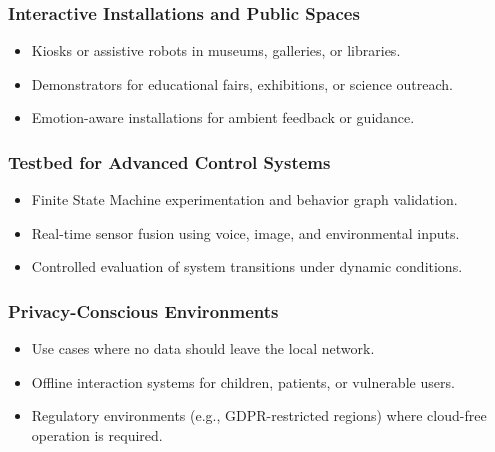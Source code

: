 \subsubsection*{Interactive Installations and Public Spaces}
\begin{itemize}
    \item Kiosks or assistive robots in museums, galleries, or libraries.
    \item Demonstrators for educational fairs, exhibitions, or science outreach.
    \item Emotion-aware installations for ambient feedback or guidance.
\end{itemize}

\subsubsection*{Testbed for Advanced Control Systems}
\begin{itemize}
    \item Finite State Machine experimentation and behavior graph validation.
    \item Real-time sensor fusion using voice, image, and environmental inputs.
    \item Controlled evaluation of system transitions under dynamic conditions.
\end{itemize}

\subsubsection*{Privacy-Conscious Environments}
\begin{itemize}
    \item Use cases where no data should leave the local network.
    \item Offline interaction systems for children, patients, or vulnerable users.
    \item Regulatory environments (e.g., GDPR-restricted regions) where cloud-free operation is required.
\end{itemize}
